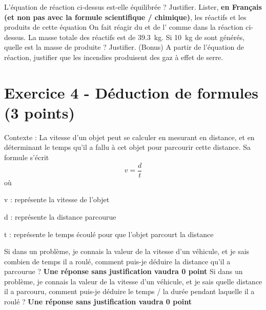\documentclass[answers]{exam}
\begin{document}
\begin{center}
\end{center}

\begin{questions}
  \question[1.5] L'équation de réaction ci-dessus est-elle équilibrée ? Justifier.
  \question[1] Lister, \textbf{en Français (et non pas avec la formule scientifique / chimique)}, les réactifs et les produits de cette équation
  \question[1] On fait réagir du  et de l' comme dans la réaction ci-dessus. La masse totale des réactifs est de \SI{39.3}{kg}. Si \SI{10}{kg} de  sont générés, quelle est la masse de  produite ? Justifier. 
  \question[0.5] (Bonus) A partir de l'équation de réaction, justifier que les incendies produisent des gaz à effet de serre.
\end{questions}


\section*{Exercice 4 - Déduction de formules (3 points)}

\begin{tcolorbox}[colback=gray!10!white, colframe=gray, title=Document 4 - La vitesse]
  Contexte : La vitesse d'un objet peut se calculer en mesurant en distance, et en déterminant le temps qu'il a fallu à cet objet pour parcourir cette distance. Sa formule s'écrit
  \[
  v = \frac{d}{t}
  \]
  où 

  \begin{addmargin}[4em]{1em}
    \begin{compactitem}
        \item [v]: représente la vitesse de l'objet
        \item [d]: représente la distance parcourue
        \item [t]: représente le temps écoulé pour que l'objet parcourt la distance
    \end{compactitem}
    \end{addmargin}
  \end{tcolorbox}


\begin{questions}
  \question[1.5] Si dans un problème, je connais la valeur de la vitesse d'un véhicule, et je sais combien de temps il a roulé, comment puis-je déduire la distance qu'il a parcourue ? \textbf{Une réponse sans justification vaudra 0 point}
  \question[1.5] Si dans un problème, je connais la valeur de la vitesse d'un véhicule, et je sais quelle distance il a parcouru, comment puis-je déduire le temps / la durée pendant laquelle il a roulé ? \textbf{Une réponse sans justification vaudra 0 point}
\end{questions}
\end{document}
